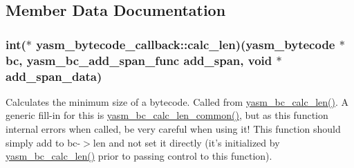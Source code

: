 \subsection{Member Data Documentation}
\hypertarget{structyasm__bytecode__callback_a8bf7bcf915f32d4e02a729a0ca5bd156}{
\subsubsection[{calc\-\_\-len}]{\setlength{\rightskip}{0pt plus 5cm}int($\ast$ yasm\-\_\-bytecode\-\_\-callback\-::calc\-\_\-len)({\bf yasm\-\_\-bytecode} $\ast$bc, {\bf yasm\-\_\-bc\-\_\-add\-\_\-span\-\_\-func} add\-\_\-span, void $\ast$add\-\_\-span\-\_\-data)}}\label{structyasm__bytecode__callback_a8bf7bcf915f32d4e02a729a0ca5bd156}
Calculates the minimum size of a bytecode. Called from \hyperlink{bytecode_8h_ae1193a627ea3a3b127c8953791bb68a9}{yasm\-\_\-bc\-\_\-calc\-\_\-len()}. A generic fill-\/in for this is \hyperlink{bytecode_8h_acfbeea52e017aff1fd67662a1a3577ad}{yasm\-\_\-bc\-\_\-calc\-\_\-len\-\_\-common()}, but as this function internal errors when called, be very careful when using it! This function should simply add to bc-\/$>$len and not set it directly (it's initialized by \hyperlink{bytecode_8h_ae1193a627ea3a3b127c8953791bb68a9}{yasm\-\_\-bc\-\_\-calc\-\_\-len()} prior to passing control to this function).



